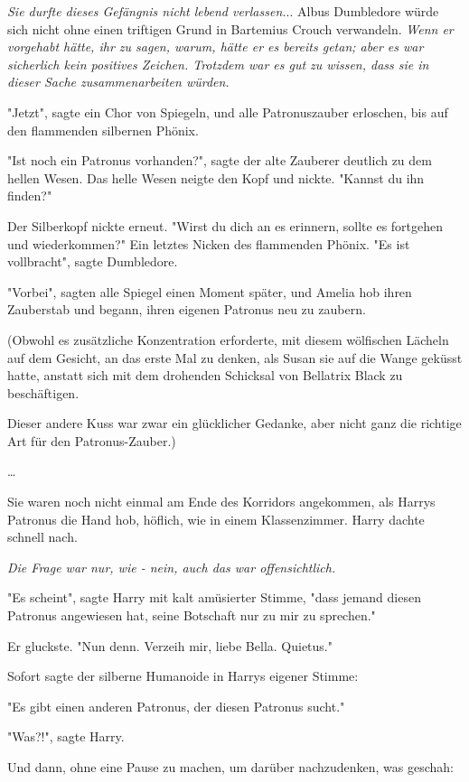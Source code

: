 {\emph{Sie durfte dieses Gefängnis nicht lebend verlassen.}.. Albus Dumbledore würde sich nicht ohne einen triftigen Grund in Bartemius Crouch verwandeln. \emph{Wenn er vorgehabt hätte, ihr zu sagen, warum, hätte er es bereits getan; aber es war sicherlich kein positives Zeichen. Trotzdem war es gut zu wissen, dass sie in dieser Sache zusammenarbeiten würden.}

"Jetzt", sagte ein Chor von Spiegeln, und alle Patronuszauber erloschen, bis auf den flammenden silbernen Phönix.

"Ist noch ein Patronus vorhanden?", sagte der alte Zauberer deutlich zu dem hellen Wesen. Das helle Wesen neigte den Kopf und nickte. "Kannst du ihn finden?"

Der Silberkopf nickte erneut. "Wirst du dich an es erinnern, sollte es fortgehen und wiederkommen?" Ein letztes Nicken des flammenden Phönix. "Es ist vollbracht", sagte Dumbledore.

"Vorbei", sagten alle Spiegel einen Moment später, und Amelia hob ihren Zauberstab und begann, ihren eigenen Patronus neu zu zaubern.

(Obwohl es zusätzliche Konzentration erforderte, mit diesem wölfischen Lächeln auf dem Gesicht, an das erste Mal zu denken, als Susan sie auf die Wange geküsst hatte, anstatt sich mit dem drohenden Schicksal von Bellatrix Black zu beschäftigen.

Dieser andere Kuss war zwar ein glücklicher Gedanke, aber nicht ganz die richtige Art für den Patronus-Zauber.)

…

Sie waren noch nicht einmal am Ende des Korridors angekommen, als Harrys Patronus die Hand hob, höflich, wie in einem Klassenzimmer. Harry dachte schnell nach.

\emph{Die Frage war nur, wie - nein, auch das war offensichtlich.}

"Es scheint", sagte Harry mit kalt amüsierter Stimme, "dass jemand diesen Patronus angewiesen hat, seine Botschaft nur zu mir zu sprechen."

Er gluckste. "Nun denn. Verzeih mir, liebe Bella. Quietus."

Sofort sagte der silberne Humanoide in Harrys eigener Stimme:

"Es gibt einen anderen Patronus, der diesen Patronus sucht."

"Was?!", sagte Harry.

Und dann, ohne eine Pause zu machen, um darüber nachzudenken, was geschah:

}

